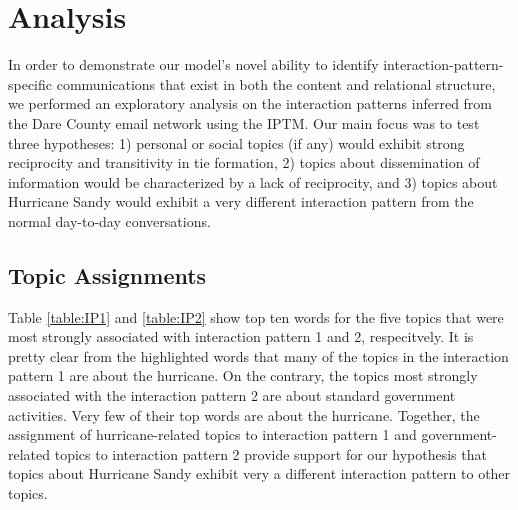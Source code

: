 \documentclass{article}
\begin{document}
\section{Analysis}\label{sec:Analysis}
In order to demonstrate our model's novel ability to identify interaction-pattern-specific communications that exist in both the content and relational structure, we performed an exploratory analysis on the interaction patterns inferred from the Dare County email network using the IPTM. Our main focus was to test three hypotheses: 1) personal or social topics (if any) would exhibit strong reciprocity and transitivity in tie formation, 2) topics about dissemination of information would be characterized by a lack of reciprocity, and 3) topics about Hurricane Sandy would exhibit a very different
interaction pattern from the normal day-to-day conversations.
\subsection{Topic Assignments}\label{subsec:Topic Assignments}
Table \ref{table:IP1} and \ref{table:IP2} show top ten words for the five topics that were most strongly
associated with interaction pattern 1 and 2, respecitvely. It is pretty clear from the highlighted words that many of the topics in the interaction pattern 1 are about the hurricane. On the contrary, the topics most strongly associated with the interaction pattern 2 are about standard government
activities. Very few of their top words are about the hurricane. Together, the assignment of hurricane-related topics to interaction pattern 1 and government-related topics to interaction pattern 2
provide support for our hypothesis that topics about Hurricane Sandy
exhibit very a different interaction pattern to other topics.
\end{document}
